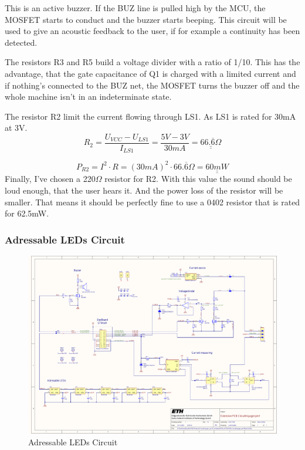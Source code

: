 This is an active buzzer. If the BUZ line is pulled high by the MCU, the MOSFET starts to conduct and the buzzer starts beeping. This circuit will be used to give an acoustic feedback to the user, if for example a continuity has been detected. 

The resistors R3 and R5 build a voltage divider with a ratio of 1/10. This has the advantage, that the gate capacitance of Q1 is charged with a limited current and if nothing's connected to the BUZ net, the MOSFET turns the buzzer off and the whole machine isn't in an indeterminate state.

The resistor R2 limit the current flowing through LS1. As LS1 is rated for 30mA at 3V.
\[R_2=\frac{U_{VCC}-U_{LS1}}{I_{LS1}}=\frac{5V-3V}{30mA}= \underline{\underline{66.\overline{6}\Omega}}\]

\[P_{R2}=I^2 \cdot R=(30mA)^2 \cdot 66. \overline{6} \Omega = \underline{\underline{60mW}}\]
Finally, I've chosen a 220\(\Omega\) resistor for R2. With this value the sound should be loud enough, that the user hears it. And the power loss of the resistor will be smaller. That means it should be perfectly fine to use a 0402 resistor that is rated for 62.5mW.


\subsubsection{Adressable LEDs Circuit}

\begin{figure}[H]
	\centering
	\includegraphics[width=15cm, trim={1.3cm 4cm 16.3cm 20cm}, clip]{../../../5_Hardware/PCB_EXTENSION_CircuitVoyager_pre1/Project Outputs for PCB_EXT_CV_PRE1/Schematic_PCB_EXTENSION_CircuitVoyager_pre1.pdf}
	\caption{Adressable LEDs Circuit}
	\label{fig:Adressable LEDs Circuit}
\end{figure}

